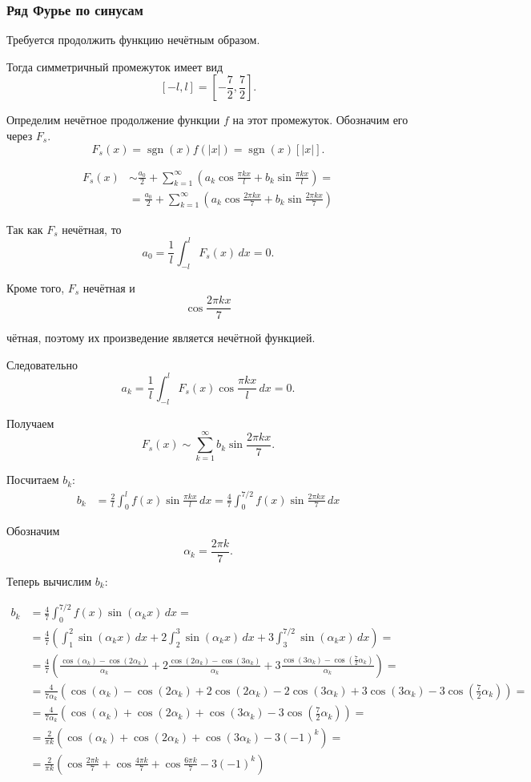 \documentclass[12pt,a4paper]{article}
\begin{document}
\subsubsection*{Ряд Фурье по синусам}

Требуется продолжить функцию нечётным образом.

Тогда симметричный промежуток имеет вид
\[
[-l,l]=\left[-\frac72,\frac72\right].
\]

Определим нечётное продолжение функции \(f\) на этот промежуток. Обозначим
его через \(F_s\).
\[
F_s(x)=\operatorname{sgn}(x)f(|x|)
=
\operatorname{sgn}(x)[|x|].
\]

\begin{align*}
F_s(x)&\sim
\frac{a_0}{2}
+
\sum_{k=1}^{\infty}
\left(
a_k\cos\frac{\pi kx}{l}
+
b_k\sin\frac{\pi kx}{l}
\right)
= \\ &=
\frac{a_0}{2}
+
\sum_{k=1}^{\infty}
\left(
a_k\cos\frac{2\pi kx}{7}
+
b_k\sin\frac{2\pi kx}{7}
\right)
\end{align*}

Так как \(F_s\) нечётная, то
\[
a_0=
\frac1l
\int_{-l}^{l}
F_s(x)\,dx
=
0.
\]

Кроме того, \(F_s\) нечётная и
\[
\cos\frac{2\pi kx}{7}
\]

чётная, поэтому их произведение является нечётной функцией.

Следовательно
\[
a_k=
\frac1l
\int_{-l}^{l}
F_s(x)\cos\frac{\pi kx}{l}\,dx
=
0.
\]

Получаем
\[
F_s(x)\sim
\sum_{k=1}^{\infty}
b_k\sin\frac{2\pi kx}{7}.
\]

Посчитаем $b_k$:
\begin{align*}
b_k
&=
\frac{2}{l}
\int_0^l
f(x)\sin\frac{\pi kx}{l}\,dx
=
\frac47
\int_0^{7/2}
f(x)\sin\frac{2\pi kx}{7}\,dx
\end{align*}

Обозначим
\[
\alpha_k=\frac{2\pi k}{7}.
\]

Теперь вычислим \(b_k\):

\begin{align*}
b_k&=
\frac47
\int_0^{7/2}
f(x)\sin(\alpha_k x)\,dx
= \\ &=
\frac47
\left(
\int_1^2 \sin(\alpha_kx)\,dx
+
2\int_2^3 \sin(\alpha_kx)\,dx
+
3\int_3^{7/2} \sin(\alpha_kx)\,dx
\right)
= \\ &=
\frac47
\left(
\frac{\cos(\alpha_k)-\cos(2\alpha_k)}{\alpha_k}
+
2\frac{\cos(2\alpha_k)-\cos(3\alpha_k)}{\alpha_k}
+
3\frac{\cos(3\alpha_k)-\cos\left(\frac72\alpha_k\right)}{\alpha_k}
\right)
= \\ &=
\frac4{7\alpha_k}
\left(
\cos(\alpha_k)-\cos(2\alpha_k)
+
2\cos(2\alpha_k)-2\cos(3\alpha_k)
+
3\cos(3\alpha_k)-3\cos\left(\frac72\alpha_k\right)
\right)
= \\ &=
\frac4{7\alpha_k}
\left(
\cos(\alpha_k)
+
\cos(2\alpha_k)
+
\cos(3\alpha_k)
-
3\cos\left(\frac72\alpha_k\right)
\right)
= \\ &=
\frac2{\pi k}
\left(
\cos(\alpha_k)
+
\cos(2\alpha_k)
+
\cos(3\alpha_k)
-
3(-1)^k
\right)
= \\ &=
\frac2{\pi k}
\left(
\cos\frac{2\pi k}{7}
+
\cos\frac{4\pi k}{7}
+
\cos\frac{6\pi k}{7}
-
3(-1)^k
\right)
\end{align*}
\end{document}
